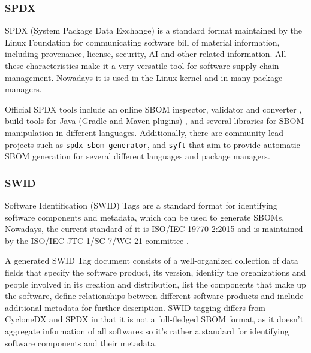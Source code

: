 \subsubsection{SPDX} \label{dataset:standard:spdx}

SPDX (System Package Data Exchange) \cite{standards:sbom:spdx} is a standard format maintained by the Linux Foundation for communicating software bill of material information, including provenance, license, security, AI and other related information.
All these characteristics make it a very versatile tool for software supply chain management. Nowadays it is used in the Linux kernel and in many package managers.

Official SPDX tools include an online SBOM inspector, validator and converter \cite{repository:spdx:online-tool}, build tools for Java (Gradle and Maven plugins) \cite{repository:spdx:gradle, repository:spdx:maven}, and several libraries for SBOM manipulation in different languages. Additionally, there are community-lead projects such as \verb|spdx-sbom-generator|, and \verb|syft| \cite{repository:spdx:spdx-sbom-generator, repository:cyclonedx:syft} that aim to provide automatic SBOM generation for several different languages and package managers.

\subsubsection{SWID} \label{dataset:standard:swid}

Software Identification (SWID) Tags \cite{standards:sbom:swid} are a standard format for identifying software components and metadata, which can be used to generate SBOMs. Nowadays, the current standard of it is ISO/IEC 19770-2:2015 \cite{standards:swid:iso19770-2:2015} and is maintained by the ISO/IEC JTC 1/SC 7/WG 21 committee \cite{standards:swid:committee}.

A generated SWID Tag document consists of a well-organized collection of data fields that specify the software product, its version, identify the organizations and people involved in its creation and distribution, list the components that make up the software, define relationships between different software products and include additional metadata for further description.
SWID tagging differs from CycloneDX and SPDX in that it is not a full-fledged SBOM format, as it doesn't aggregate information of all softwares so it's rather a standard for identifying software components and their metadata.


